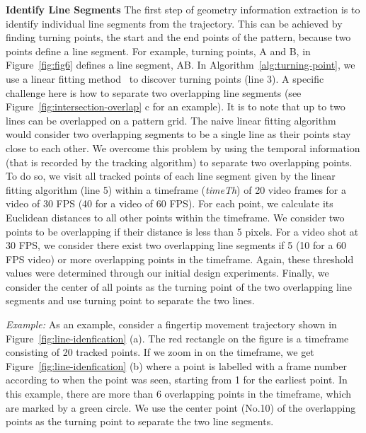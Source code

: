         \noindent \textbf{Identify Line Segments}
        The first step of geometry information extraction is to identify individual
        line segments from the trajectory. This can be achieved
        by finding turning points, the start and the end points of the pattern, because two points define a line segment. For example, turning points, A and B, in
        Figure~\ref{fig:fig6} defines a line segment, AB. In
        Algorithm~\ref{alg:turning-point}, we use a linear fitting
        method~\cite{Kutner2004Applied} to discover turning points (line 3). A specific
        challenge here is how to separate two overlapping line segments (see
        Figure~\ref{fig:intersection-overlap} c for an example).
        It is to note that up to two lines can be overlapped on a pattern grid.
        The naive
        linear fitting algorithm would consider two overlapping segments to be a
        single line as their points stay close to each other. We overcome this problem
       by using the temporal information (that is recorded by the
        tracking algorithm) to separate two overlapping points.
        To do so, we visit all tracked points of each line segment given by the linear fitting algorithm (line
        5) within a timeframe (\emph{timeTh}) of 20 video frames for a video of 30 FPS (40 for a video of 60 FPS).
        For each point, we calculate its Euclidean distances to all other points within the timeframe.
        We consider two points to be overlapping if their distance is less than 5 pixels.
        For a video shot at 30 FPS, we consider there exist two overlapping line segments if 5 (10 for a 60 FPS video) or more overlapping points in the timeframe.
        Again, these threshold values were determined through our initial design experiments.
        Finally, we consider the center of all points as the turning point of the two overlapping line segments and use turning point to separate the two lines.

        \noindent \emph{Example:} As an example, consider a fingertip movement trajectory shown in
        Figure~\ref{fig:line-idenfication} (a). The red rectangle on the
        figure is a timeframe consisting of 20 tracked points.  If we zoom in
        on the timeframe, we get Figure~\ref{fig:line-idenfication} (b) where
        a point is labelled with a frame number according to when
        the point was seen, starting from 1 for the earliest point. In this example, there are more than 6
        overlapping points in the timeframe, which are marked by a green
        circle. We use the center
        point (No.10) of the overlapping points as the turning point to separate the two line segments.


